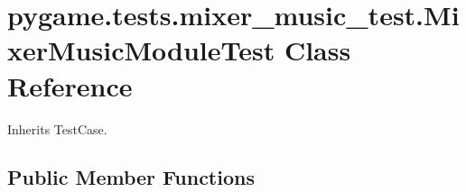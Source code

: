 \hypertarget{classpygame_1_1tests_1_1mixer__music__test_1_1_mixer_music_module_test}{}\section{pygame.\+tests.\+mixer\+\_\+music\+\_\+test.\+Mixer\+Music\+Module\+Test Class Reference}
\label{classpygame_1_1tests_1_1mixer__music__test_1_1_mixer_music_module_test}


Inherits Test\+Case.

\subsection*{Public Member Functions}
